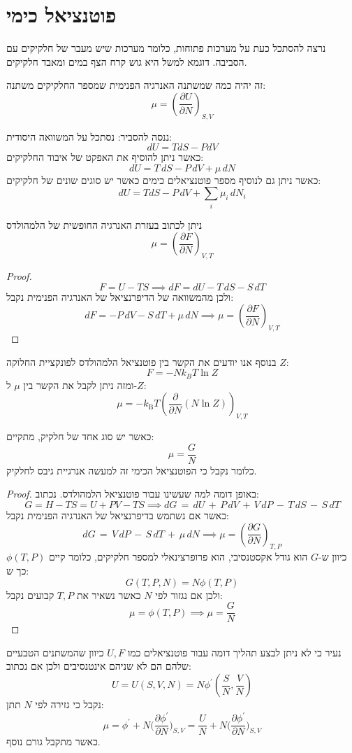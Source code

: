 \documentclass{tstextbook}
\begin{document}
\section{פוטנציאל כימי}

נרצה להסתכל כעת על מערכות פתוחות, כלומר מערכות שיש מעבר של חלקיקים עם הסביבה. דוגמא למשל היא גוש קרח הצף במים ומאבד חלקיקים.

\begin{definition}
זה יהיה כמה שמשתנה האנרגיה הפנימית שמספר החלקיקים משתנה:
$$\mu\!=\!\left({\frac{\partial U}{\partial N}}\right)_{S,V}$$

\end{definition}
ננסה להסביר:
נסתכל על המשוואה היסודית:
$$d U=T d S-P d V$$
כאשר ניתן להוסיף את האפקט של איבוד החלקיקים:
$$d U=T\,d S-P\,d V+\mu\,d N$$
כאשר ניתן גם לנוסיף מספר פוטנציאלים כימים כאשר יש סוגים שונים של חלקיקים:
$$d U=T d S-P\,d V+\sum_{i}\mu_{i}\,d N_{i}$$

\begin{proposition}
ניתן לכתוב בעזרת האנרגיה החופשית של הלמהולדס
$$\mu=\left({\frac{\partial F}{\partial N}}\right)_{V,T}$$

\end{proposition}
\begin{proof}
$${F=U-T S}\implies d F=d U-T\,d S-S\,d T$$
ולכן מהמשוואה של הדיפרנציאל של האנרגיה הפנימית נקבל:
$$d F=-P\,d V-S\,d T+\mu\,d N\implies \mu=\left({\frac{\partial F}{\partial N}}\right)_{V,T}$$

\end{proof}
בנוסף אנו יודעים את הקשר בין פוטנציאל הלמהולדס לפונקציית החלוקה \(Z\):
$$F=-N k_{B}T\ln Z$$
ומזה ניתן לקבל את הקשר בין \(\mu\) ל-\(Z\):
$$\mu=-k_{\mathrm{{B}}}T\left({\frac{\partial}{\partial N}}(N\ln Z)\right)_{V,T}$$

\begin{proposition}
כאשר יש סוג אחד של חלקיק, מתקיים:
$$\mu=\frac{G}{N}$$
כלומר נקבל כי הפוטנציאל הכימי זה למעשה אנרגיית גיבס לחלקיק.

\end{proposition}
\begin{proof}
באופן דומה למה שעשינו עבור פוטנציאל הלמהולדס. נכתוב:
$$G=H-T S=U+P V-T S\implies  d G\,=\,d U\,+\,P\,d V\,+\,V\,d P\,-\,T\,d S\,-\,S\,d T$$
כאשר אם נשתמש בדיפרנציאל של האנרגיה הפנימית נקבל:
$$d G\,=\,V\,d P\,-\,S\,d T\,+\,\mu\,d N\implies \mu=\left({\frac{\partial G}{\partial N}}\right)_{T,P}$$
כיוון ש-\(G\) הוא גודל אקסטנסיבי, הוא פרופרצינאלי למספר חלקיקים, כלומר קיים \(\phi(T,P)\) כך ש:
$$G(T,P,N)\!=\!N\phi(T,P)$$
ולכן אם נגזור לפי \(N\) כאשר נשאיר את \(T,P\) קבועים נקבל:
$$\mu=\phi(T,P)\implies \mu=\frac{G}{N}$$

\end{proof}
נעיר כי לא ניתן לבצע תהליך דומה עבור פוטנציאלים כמו \(U,F\) כיוון שהמשתנים הטבעיים שלהם הם לא שניהם אינטנסיבים ולכן אם נכתוב:
$$U\!=\!U\!(S,V,N)\!=\!N\phi^{\prime}\!\left({\frac{S}{N}},{\frac{V}{N}}\right)$$
נקבל כי גזירה לפי \(N\) תתן:
$$\mu=\phi^{\prime}+N\Biggl(\frac{\partial\phi^{\prime}}{\partial N}\Biggr)_{S,V}=\frac{U}{N}+N\Biggl(\frac{\partial\phi^{\prime}}{\partial N}\Biggr)_{S,V}$$
כאשר מתקבל גורם נוסף.
\end{document}
